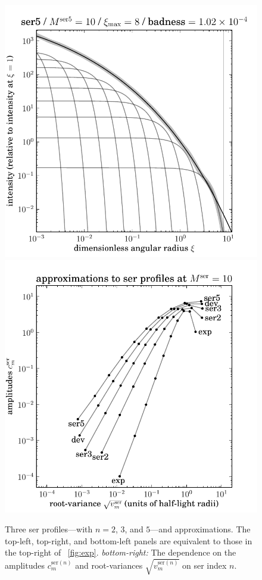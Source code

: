\documentclass[12pt,pdftex,preprint]{aastex}
\newlength{\figurewidth}
\newcommand{\ser}{\mathrm{ser}}
\begin{document}
\begin{figure}
\includegraphics[width=\figurewidth]{ser5_K10_MR08_profile_log.pdf}%
\includegraphics[width=\figurewidth]{mixtures_vs_model_K10.pdf}
\caption{Three ser profiles---with $n=2$, $3$, and $5$---and
  approximations.  The top-left, top-right, and bottom-left panels are
  equivalent to those in the top-right of \figurename~\ref{fig:exp}.
  \textsl{bottom-right:} The dependence on the amplitudes $c^{\ser(n)}_m$
  and root-variances $\sqrt{v^{\ser(n)}_m}$ on ser index $n$.\label{fig:ser}}
\end{figure}
\end{document}
